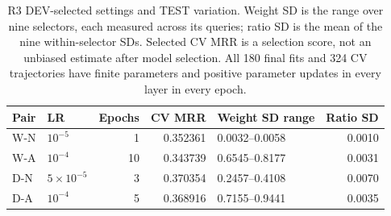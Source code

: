 \begin{table}[htbp]
\centering\small
\setlength{\tabcolsep}{4pt}
\caption{R3 DEV-selected settings and TEST variation. Weight SD is the range over nine selectors, each measured across its queries; ratio SD is the mean of the nine within-selector SDs. Selected CV MRR is a selection score, not an unbiased estimate after model selection. All 180 final fits and 324 CV trajectories have finite parameters and positive parameter updates in every layer in every epoch.}
\label{tab:dyna-selection}
\begin{tabular}{llrrlr}
\toprule
Pair & LR & Epochs & CV MRR & Weight SD range & Ratio SD\\
\midrule
W-N & $10^{-5}$ & 1 & 0.352361 & 0.0032--0.0058 & 0.0010\\
W-A & $10^{-4}$ & 10 & 0.343739 & 0.6545--0.8177 & 0.0031\\
D-N & $5\times10^{-5}$ & 3 & 0.370354 & 0.2457--0.4108 & 0.0070\\
D-A & $10^{-4}$ & 5 & 0.368916 & 0.7155--0.9441 & 0.0035\\
\bottomrule
\end{tabular}
\end{table}
